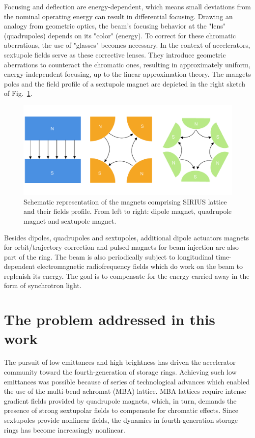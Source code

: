 Focusing and deflection are energy-dependent, which means small deviations from the nominal operating energy can result in differential focusing. Drawing an analogy from geometric optics, the beam's focusing behavior at the "lens" (quadrupoles) depends on its "color" (energy). To correct for these chromatic aberrations, the use of "glasses" becomes necessary. In the context of accelerators, sextupole fields serve as these corrective lenses. They introduce geometric aberrations to counteract the chromatic ones, resulting in approximately uniform, energy-independent focusing, up to the linear approximation theory. The mangets poles and the field profile of a sextupole magnet are depicted in the right sketch of Fig.~\ref{fig:magnets_fields}.
\begin{figure}[htb]
    \includegraphics[width=\textwidth]{Images/magnets.pdf}
    \caption{Schematic representation of the magnets comprising SIRIUS lattice and their fields profile. From left to right: dipole magnet, quadrupole magnet and sextupole magnet.}
    \label{fig:magnets_fields}
\end{figure}

Besides dipoles, quadrupoles and sextupoles, additional dipole actuators magnets for orbit/trajectory correction and pulsed magnets for beam injection are also part of the ring. The beam is also periodically subject to longitudinal time-dependent electromagnetic radiofrequency fields which do work on the beam to replenish its energy. The goal is to compensate for the energy carried away in the form of synchrotron light.

\section{The problem addressed in this work}
The pursuit of low emittances and high brightness has driven the accelerator community toward the fourth-generation of storage rings. Achieving such low emittances was possible because of series of technological advances which enabled the use of the multi-bend achromat (MBA) lattice\cite{liu_towards_2017,hettel_challenges_2014}. MBA lattices require intense gradient fields provided by quadrupole magnets, which, in turn, demands the presence of strong sextupolar fields to compensate for chromatic effects. Since sextupoles provide nonlinear fields, the dynamics in fourth-generation storage rings has become increasingly nonlinear\cite{liu_towards_2017}.

